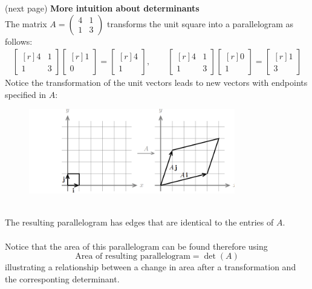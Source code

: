 \documentclass{report}
\begin{document}
(next page)
\newpage
\noindent\textbf{More intuition about determinants}\\
The matrix $A=\left(\begin{smallmatrix}4&1\\1&3\end{smallmatrix}\right)$ 
transforms the unit square into a parallelogram as follows:
\begin{align*}
\begin{bmatrix*}[r]
4&1\\1&3
\end{bmatrix*}
\begin{bmatrix*}[r]
1\\0
\end{bmatrix*}
=\begin{bmatrix*}[r]
4\\1
\end{bmatrix*},\quad\quad
\begin{bmatrix*}[r]
4&1\\1&3
\end{bmatrix*}
\begin{bmatrix*}[r]
0\\1
\end{bmatrix*}
=\begin{bmatrix*}[r]
1\\3
\end{bmatrix*}
\end{align*}
Notice the transformation of the unit vectors leads to new vectors with endpoints
specified in $A$:
\begin{figure}[h]
\includegraphics[width=9cm]{Capture80}\\
\centering
\end{figure}\\
The resulting parallelogram has edges that are identical to the entries of $A$.\\
\vspace{1mm}\\
Notice that the area of this parallelogram can be found therefore using
\begin{equation*}
\text{Area of resulting parallelogram}=\det(A)
\end{equation*}
illustrating a relationship between a change in area after a transformation 
and the corresponting determinant. 
\newpage
\end{document}
